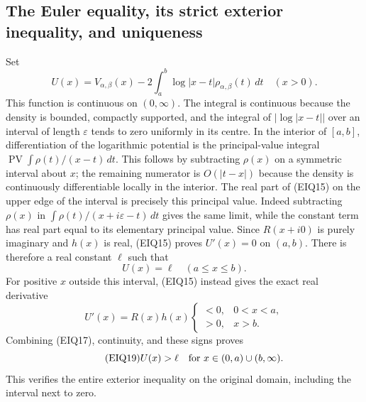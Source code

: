 \documentclass[11pt,a4paper]{article}
\begin{document}
\subsection{The Euler equality, its strict exterior inequality, and uniqueness}
Set
\begin{equation}\tag{EIQ16}
 U(x)=V_{\alpha,\beta}(x)
             -2\int_a^b\log|x-t|\rho_{\alpha,\beta}(t)\,dt
 \quad(x>0).
\end{equation}
This function is continuous on $(0,\infty)$.  The integral is continuous
because the density is bounded, compactly supported, and the integral
of $|\log|x-t||$ over an interval of length $\varepsilon$ tends to zero
uniformly in its centre.  In the interior of $[a,b]$, differentiation of
the logarithmic potential is the principal-value integral
$\operatorname{PV}\int\rho(t)/(x-t)\,dt$.
This follows by subtracting $\rho(x)$ on a symmetric interval about
$x$; the remaining numerator is $O(|t-x|)$ because the density is
continuously differentiable locally in the interior.  The real part of
(EIQ15) on the upper edge of the interval is precisely this principal
value.  Indeed subtracting $\rho(x)$ in
$\int\rho(t)/(x+i\varepsilon-t)\,dt$ gives the same limit, while the
constant term has real part equal to its elementary principal value.
Since $R(x+i0)$ is purely imaginary and $h(x)$ is real, (EIQ15) proves
$U'(x)=0$ on $(a,b)$.  There is therefore a real constant $\ell$ such that
\begin{equation}\tag{EIQ17}
 U(x)=\ell\quad(a\leq x\leq b).
\end{equation}
For positive $x$ outside this interval, (EIQ15) instead gives the exact
real derivative
\begin{equation}\tag{EIQ18}
 U'(x)=R(x)h(x)
 \begin{cases}<0,&0<x<a,\\>0,&x>b.\end{cases}
\end{equation}
Combining (EIQ17), continuity, and these signs proves
\begin{equation}\tag{EIQ19}
 U(x)>\ell\quad\hbox{for }x\in(0,a)\cup(b,\infty).
\end{equation}
This verifies the entire exterior inequality on the original domain,
including the interval next to zero.
\end{document}
